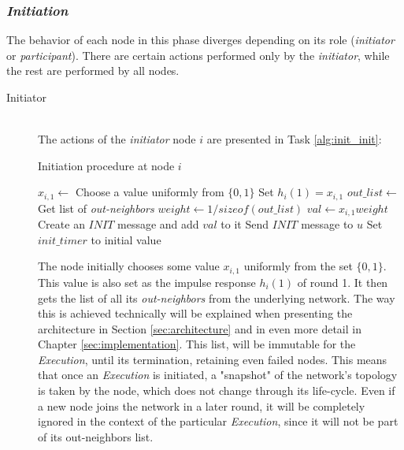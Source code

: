 \documentclass[a4paper,11pt,twoside]{report}
\begin{document}
\subsubsection*{\textit{Initiation}}

The behavior of each node in this phase diverges depending on its role (\textit{initiator} or \textit{participant}). There are certain actions performed only by the \textit{initiator}, while the rest are performed by all nodes.
	
\begin{description}
	\item[Initiator] \hfill \\
	The actions of the \textit{initiator} node $i$ are presented in Task \ref{alg:init_init}:
					 \setcounter{algorithm}{0}
					\begin{algorithm}
					\caption{Initiation procedure at node $i$}
					\label{alg:init_init}
					\begin{algorithmic}[1]
					\STATE $x_{i,1} \leftarrow$  Choose a value uniformly from $\{0,1\}$
					\STATE Set $h_i(1)=x_{i,1}$
					\STATE $out\_list \leftarrow$  Get list of \textit{out-neighbors}
					\STATE $weight \leftarrow 1/sizeof(out\_list)$
					\STATE $val \leftarrow x_{i,1}weight $
					\STATE Create an $INIT$ message and add $val$ to it
					\STATE Send $INIT$ message to $u$
					\ENDFOR
					\STATE Set $init\_timer$ to initial value
					\end{algorithmic}
					\end{algorithm}	
		
	 The node initially chooses some value $x_{i,1}$ uniformly from the set $\{0,1\}$. This value is also set as the impulse response $h_i(1)$ of round 1. It then gets the list of all its \textit{out-neighbors} from the underlying network. The way this is achieved technically will be explained when presenting the architecture in Section \ref{sec:architecture} and in even more detail in Chapter \ref{sec:implementation}. This list, will be immutable for the \textit{Execution}, until its termination, retaining even failed nodes. This means that once an \textit{Execution} is initiated, a "snapshot" of the network's topology is taken by the node, which does not change through its life-cycle. Even if a new node joins the network in a later round, it will be completely ignored in the context of the particular \textit{Execution}, since it will not be part of its out-neighbors list.
	

\end{description}
\end{document}
